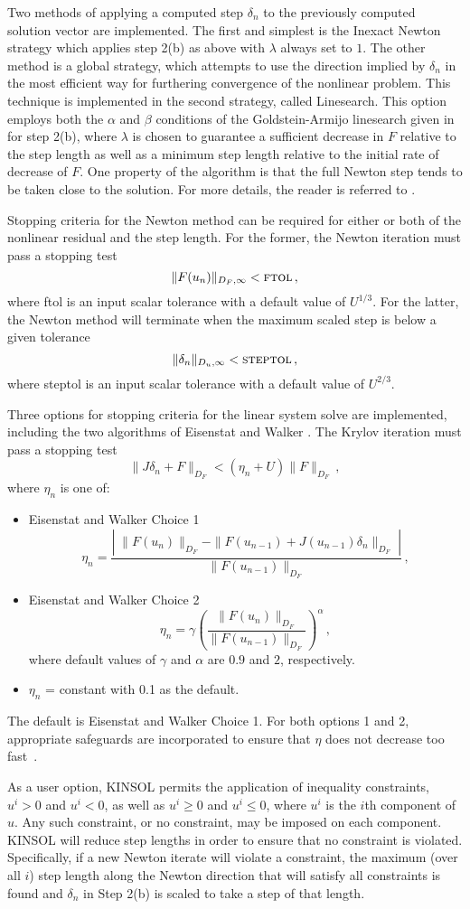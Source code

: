 Two methods of applying a computed step $\delta_n$ to the
previously computed solution vector are implemented. The first and
simplest is the Inexact Newton strategy which applies step 2(b) as
above with $\lambda$ always set to $1$. The other method is a
global strategy, which attempts to use the direction implied by
$\delta_n$ in the most efficient way for furthering convergence of
the nonlinear problem. This technique is implemented in the second
strategy, called Linesearch.  This option employs both the
$\alpha$ and $\beta$ conditions of the Goldstein-Armijo linesearch
given in \cite{DeSc:96} for step 2(b), where $\lambda$ is chosen
to guarantee a sufficient decrease in $F$ relative to the step
length as well as a minimum step length relative to the initial
rate of decrease of $F$.  One property of the algorithm is that
the full Newton step tends to be taken close to the solution.  For
more details, the reader is referred to \cite{DeSc:96}.

Stopping criteria for the Newton method can be required for either or
both of the nonlinear residual and the step length.  For the former,
the Newton iteration must pass a stopping test
\[ \|F(u_n)\|_{D_F,\infty} < \mbox{\sc ftol} \, , \]
where {\sc ftol} is an input scalar tolerance with a default value of
$U^{1/3}$.
For the latter, the Newton method will terminate when the maximum scaled step
is below a given tolerance
\[ \|\delta_n\|_{D_u,\infty} < \mbox{\sc steptol} \, , \]
where {\sc steptol} is an input scalar tolerance with a default value of
$U^{2/3}$.

Three options for stopping criteria for the linear system solve are
implemented, including the two
algorithms of Eisenstat and Walker \cite{EiWa:96}.
The Krylov iteration must pass a stopping test
\[ \|J \delta_n + F\|_{D_F} < (\eta_n + U) \|F\|_{D_F} \, , \]
where $\eta_n$ is one of:
\begin{itemize}
\item Eisenstat and Walker Choice 1
  \[
  \eta_n = \frac{\left|\; \|F(u_n)\|_{D_F}
      - \|F(u_{n-1}) + J(u_{n-1}) \delta_n \|_{D_F}
      \; \right|}
  {\|F(u_{n-1})\|_{D_F}} \, ,
  \]
\item Eisenstat and Walker Choice 2
  \[
  \eta_n = \gamma
  \left( \frac{ \|F(u_n)\|_{D_F}}{\|F(u_{n-1})\|_{D_F}} \right)^{\alpha} \, ,
  \]
where default values of $\gamma$ and $\alpha$ are $0.9$ and $2$,
 respectively.
\item  $\eta_n$ = constant with 0.1 as the default.
\end{itemize}
The default is Eisenstat and Walker Choice 1. For both options 1 and 2,
appropriate safeguards are incorporated to ensure that $\eta$ does not
decrease too fast~\cite{EiWa:96}.

As a user option, KINSOL permits the application of inequality
constraints, $u^i > 0$ and $u^i < 0$, as well as $u^i \geq 0$ and
$u^i \leq 0$, where $u^i$ is the $i$th component of $u$.  Any such
constraint, or no constraint, may be imposed on each component.
KINSOL will reduce step lengths in order to ensure that no
constraint is violated.  Specifically, if a new Newton iterate
will violate a constraint, the maximum (over all $i$) step length
along the Newton direction that will satisfy all constraints is
found and $\delta_n$ in Step 2(b) is scaled to take a step of that
length.
